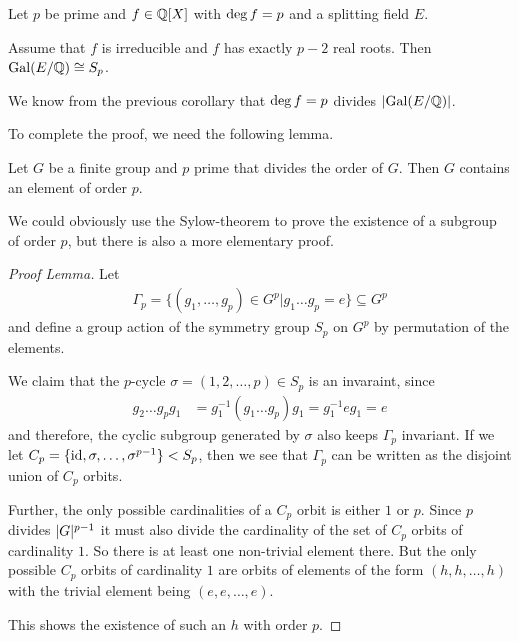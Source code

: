 \begin{thm}[]
  Let $p$ be prime and $f \in \mathbb{Q}[X]$ with $\operatorname{deg} f = p$ and a splitting field $E$.

  Assume that $f$ is irreducible and $f$ has exactly $p-2$ real roots. 
  Then $\operatorname{Gal}(E/\mathbb{Q}) \cong S_p$.
\end{thm}
We know from the previous corollary that $\operatorname{deg} f = p$ divides $\abs{\Gal(E/\Q)}$.

To complete the proof, we need the following lemma.
\begin{lem}[Cauchy]
  Let $G$ be a finite group and $p$ prime that divides the order of $G$. 
  Then $G$ contains an element of order $p$.
\end{lem}
We could obviously use the Sylow-theorem to prove the existence of a subgroup of order $p$, but there is also a more elementary proof.
\begin{proof}[Proof Lemma]
  Let
  \begin{align*}
    \Gamma_p = \{
      (g_1, \ldots, g_p) \in G^{p} \big\vert g_1 \dots g_p = e
    \} \subseteq G^{p}
  \end{align*}
  and define a group action of the symmetry group $S_p$ on $G^{p}$ by permutation of the elements.

  We claim that the $p$-cycle $\sigma = (1, 2, \ldots, p) \in S_p$ is an invaraint, since
  \begin{align*}
    g_{2}\dots g_{p}g_1 &= g_1^{-1}(g_{1}\dots g_{p})g_1 = g_1^{-1} e g_1 = e 
  \end{align*}
  and therefore, the cyclic subgroup generated by $\sigma$ also keeps $\Gamma_p$ invariant.
  If we let $C_p = \{\operatorname{id}, \sigma, \ldots, \sigma^{p-1}\} < S_p$, then we see that $\Gamma_p$ can be written as the disjoint union of $C_p$ orbits.

  Further, the only possible cardinalities of a $C_p$ orbit is either $1$ or $p$. 
  Since $p$ divides $\vert G\vert^{p-1}$ it must also divide the cardinality of the set of $C_p$ orbits of cardinality $1$. 
  So there is at least one non-trivial element there.
  But the only possible $C_p$ orbits of cardinality $1$ are orbits of elements of the form $(h,h, \ldots,h)$ with the trivial element being $(e,e,\ldots,e)$.

  This shows the existence of such an $h$ with order $p$.
\end{proof}

